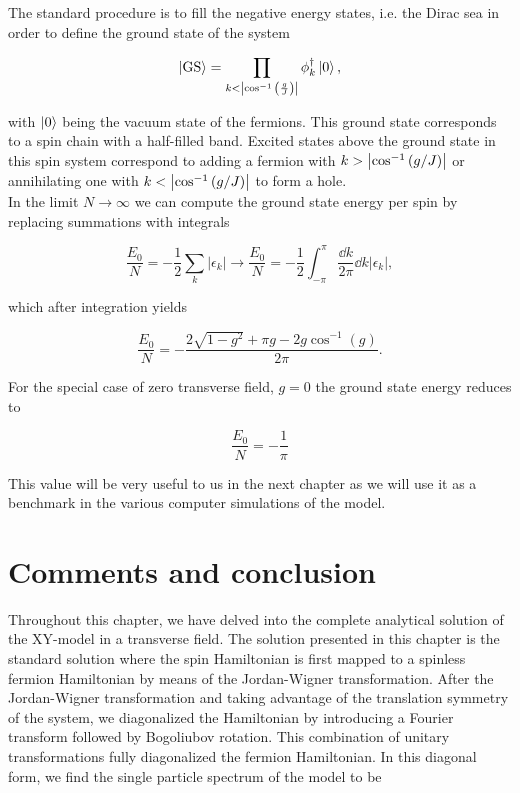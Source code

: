 The standard procedure is to fill the negative energy states, i.e. the Dirac sea in order to define the ground state of the system

\begin{equation}
\ket{\text{GS}} = \prod_{k<\abs{\cos^{-1}\qty(\frac{g}{J})}}\phi^\dagger_k\ket{0},
\end{equation}

with $\ket{0}$ being the vacuum state of the fermions. This ground state corresponds to a spin chain with a half-filled band. Excited states above the ground state in this spin system correspond to adding a fermion with $k>\abs{\cos^{-1}\qty(g/J)}$ or annihilating one with $k<\abs{\cos^{-1}\qty(g/J)}$ to form a hole. \\

In the limit $N\to\infty$ we can compute the ground state energy per spin by replacing summations with integrals

\begin{equation}
\frac{E_0}{N} = -\frac{1}{2}\sum_k|\epsilon_k|\to \frac{E_0}{N} = -\frac{1}{2}\int_{-\pi}^{\pi}\frac{\dd{k}}{2\pi}\dd{k}|\epsilon_k|,
\end{equation}

which after integration yields

\begin{equation*}
	\frac{E_0}{N} =-\frac{2 \sqrt{1-g^2}+\pi  g-2 g \cos^{-1}(g)}{2 \pi }.
\end{equation*}

For the special case of zero transverse field, $g=0$ the ground state energy reduces to

\begin{equation}
\frac{E_0}{N} = -\frac{1}{\pi}
\end{equation}

This value will be very useful to us in the next chapter as we will use it as a benchmark in the various computer simulations of the model.

\section{Comments and conclusion}\label{sec:conclusion2}

Throughout this chapter, we have delved into the complete analytical solution of the XY-model in a transverse field. The solution presented in this chapter is the standard solution where the spin Hamiltonian is first mapped to a spinless fermion Hamiltonian by means of the Jordan-Wigner transformation. After the Jordan-Wigner transformation and taking advantage of the translation symmetry of the system, we diagonalized the Hamiltonian by introducing a Fourier transform followed by Bogoliubov rotation. This combination of unitary transformations fully diagonalized the fermion Hamiltonian. In this diagonal form, we find the single particle spectrum of the model to be 

